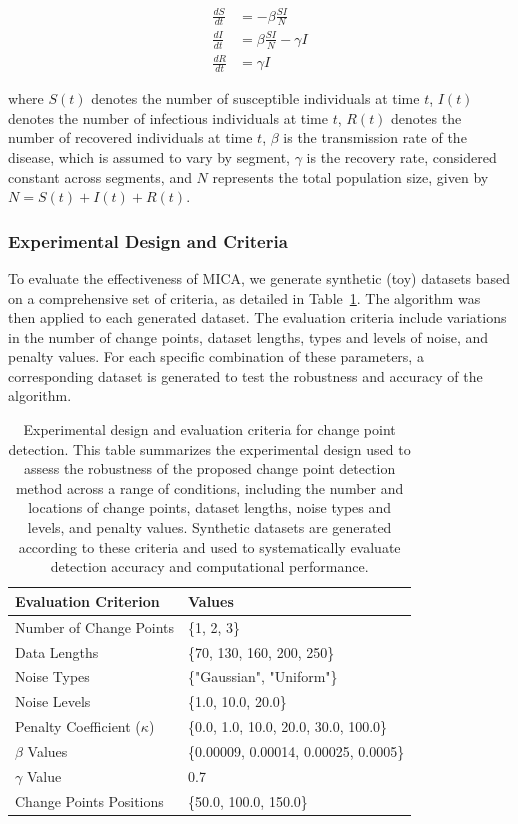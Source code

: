 \documentclass[10pt,letterpaper]{article}
\begin{document}
\begin{align}\label{SIR}
    \frac{dS}{dt} &= -\beta \frac{S I}{N} \nonumber \\
    \frac{dI}{dt} &= \beta \frac{S I}{N} - \gamma I \\
    \frac{dR}{dt} &= \gamma I \nonumber
\end{align}

where \( S(t) \) denotes the number of susceptible individuals at time \( t \), \( I(t) \) denotes the number of infectious individuals at time \( t \), \( R(t) \) denotes the number of recovered individuals at time \( t \), \( \beta \) is the transmission rate of the disease, which is assumed to vary by segment, \( \gamma \) is the recovery rate, considered constant across segments, and \( N \) represents the total population size, given by \( N = S(t) + I(t) + R(t) \).

\subsubsection*{Experimental Design and Criteria}

To evaluate the effectiveness of MICA, we generate synthetic (toy) datasets based on a comprehensive set of criteria, as detailed in Table~\ref{tab:criteria_evaluation}. The algorithm was then applied to each generated dataset. The evaluation criteria include variations in the number of change points, dataset lengths, types and levels of noise, and penalty values. For each specific combination of these parameters, a corresponding dataset is generated to test the robustness and accuracy of the algorithm.

\begin{table}[h]
\centering
\begin{tabular}{|l|l|}
\hline
\textbf{Evaluation Criterion} & \textbf{Values} \\ \hline
Number of Change Points & \{1, 2, 3\} \\ \hline
Data Lengths & \{70, 130, 160, 200, 250\} \\ \hline
Noise Types & \{"Gaussian", "Uniform"\} \\ \hline
Noise Levels & \{1.0, 10.0, 20.0\} \\ \hline
Penalty Coefficient ($\kappa$) & \{0.0, 1.0, 10.0, 20.0, 30.0, 100.0\} \\ \hline
$\beta$ Values & \{0.00009, 0.00014, 0.00025, 0.0005\} \\ \hline
$\gamma$ Value & 0.7 \\ \hline
Change Points Positions & \{50.0, 100.0, 150.0\} \\ \hline
\end{tabular}
\caption{Experimental design and evaluation criteria for change point detection.
This table summarizes the experimental design used to assess the robustness of the proposed change point detection method across a range of conditions, including the number and locations of change points, dataset lengths, noise types and levels, and penalty values. Synthetic datasets are generated according to these criteria and used to systematically evaluate detection accuracy and computational performance.}
\label{tab:criteria_evaluation}
\end{table}
\end{document}
